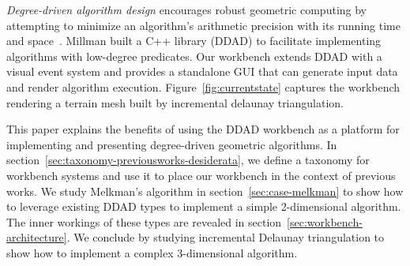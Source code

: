 \emph{Degree-driven algorithm design} encourages robust geometric computing by
attempting to minimize an algorithm's arithmetic precision with its running time
and space~\cite{millman2012degree}. Millman built a C++ library (DDAD) to
facilitate implementing algorithms with low-degree predicates. Our workbench
extends DDAD with a visual event system and provides a standalone GUI that can
generate input data and render algorithm execution.
Figure~\ref{fig:currentstate} captures the workbench rendering a terrain mesh
built by incremental delaunay triangulation.

This paper explains the benefits of using the DDAD workbench as a platform for
implementing and presenting degree-driven geometric algorithms. In
section~\ref{sec:taxonomy-previousworks-desiderata}, we define a taxonomy for
workbench systems and use it to place our workbench in the context of previous
works. We study Melkman's algorithm in section~\ref{sec:case-melkman} to show
how to leverage existing DDAD types to implement a simple 2-dimensional
algorithm. The inner workings of these types are revealed in
section~\ref{sec:workbench-architecture}. We conclude by studying incremental
Delaunay triangulation to show how to implement a complex 3-dimensional
algorithm.




 